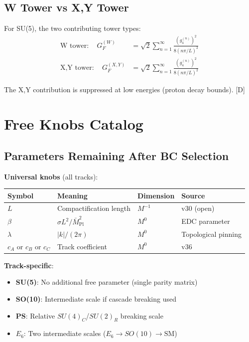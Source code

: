 \documentclass[11pt,a4paper]{article}
\newcommand{\tagD}{\textcolor{blue!70!black}{[D]}}
\begin{document}
\subsection{W Tower vs X,Y Tower}

For SU(5), the two contributing tower types:
\begin{align}
\label{eq:W-tower-contrib}
\text{W tower}: \quad G_F^{(W)} &= \sqrt{2} \sum_{n=1}^\infty \frac{(g_4^{(n)})^2}{8(n\pi/L)^2} \\
\label{eq:XY-tower-contrib}
\text{X,Y tower}: \quad G_F^{(X,Y)} &= \sqrt{2} \sum_{n=1}^\infty \frac{(g_4^{(n)})^2}{8(n\pi/L)^2}
\end{align}

The X,Y contribution is suppressed at low energies (proton decay bounds). \tagD

\section{Free Knobs Catalog}

\subsection{Parameters Remaining After BC Selection}

\begin{resultbox}
\textbf{Universal knobs} (all tracks):
\begin{center}
\begin{tabular}{llll}
\toprule
Symbol & Meaning & Dimension & Source \\
\midrule
$L$ & Compactification length & $M^{-1}$ & v30 (open) \\
$\beta$ & $\sigma L^2/\bar{M}_{\text{Pl}}^2$ & $M^0$ & EDC parameter \\
$\lambda$ & $|k|/(2\pi)$ & $M^0$ & Topological pinning \\
$c_A$ or $c_B$ or $c_C$ & Track coefficient & $M^0$ & v36 \\
\bottomrule
\end{tabular}
\end{center}

\textbf{Track-specific}:
\begin{itemize}
    \item \textbf{SU(5)}: No additional free parameter (single parity matrix)
    \item \textbf{SO(10)}: Intermediate scale if cascade breaking used
    \item \textbf{PS}: Relative $SU(4)_C$/$SU(2)_R$ breaking scale
    \item \textbf{$E_6$}: Two intermediate scales ($E_6 \to SO(10) \to \text{SM}$)
\end{itemize}
\end{resultbox}
\end{document}
